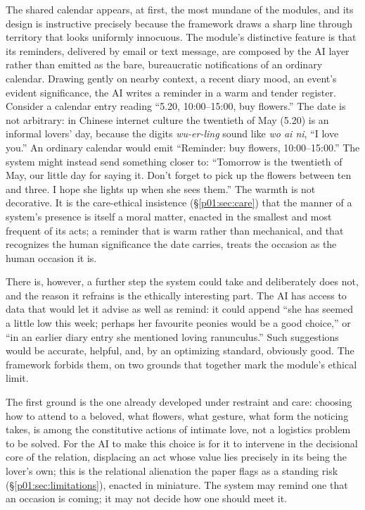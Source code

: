 \documentclass[11pt,a4paper]{article}
\begin{document}
The shared calendar appears, at first, the most mundane of the modules, and its design is instructive precisely because the framework draws a sharp line through territory that looks uniformly innocuous. The module's distinctive feature is that its reminders, delivered by email or text message, are composed by the AI layer rather than emitted as the bare, bureaucratic notifications of an ordinary calendar. Drawing gently on nearby context, a recent diary mood, an event's evident significance, the AI writes a reminder in a warm and tender register. Consider a calendar entry reading ``5.20, 10:00--15:00, buy flowers.'' The date is not arbitrary: in Chinese internet culture the twentieth of May (5.20) is an informal lovers' day, because the digits \emph{wu-er-ling} sound like \emph{wo ai ni}, ``I love you.'' An ordinary calendar would emit ``Reminder: buy flowers, 10:00--15:00.'' The system might instead send something closer to: ``Tomorrow is the twentieth of May, our little day for saying it. Don't forget to pick up the flowers between ten and three. I hope she lights up when she sees them.'' The warmth is not decorative. It is the care-ethical insistence (§\ref{p01:sec:care}) that the manner of a system's presence is itself a moral matter, enacted in the smallest and most frequent of its acts; a reminder that is warm rather than mechanical, and that recognizes the human significance the date carries, treats the occasion as the human occasion it is.

There is, however, a further step the system could take and deliberately does not, and the reason it refrains is the ethically interesting part. The AI has access to data that would let it advise as well as remind: it could append ``she has seemed a little low this week; perhaps her favourite peonies would be a good choice,'' or ``in an earlier diary entry she mentioned loving ranunculus.'' Such suggestions would be accurate, helpful, and, by an optimizing standard, obviously good. The framework forbids them, on two grounds that together mark the module's ethical limit.

The first ground is the one already developed under restraint and care: choosing how to attend to a beloved, what flowers, what gesture, what form the noticing takes, is among the constitutive actions of intimate love, not a logistics problem to be solved. For the AI to make this choice is for it to intervene in the decisional core of the relation, displacing an act whose value lies precisely in its being the lover's own; this is the relational alienation the paper flags as a standing risk (§\ref{p01:sec:limitations}), enacted in miniature. The system may remind one that an occasion is coming; it may not decide how one should meet it.
\end{document}
